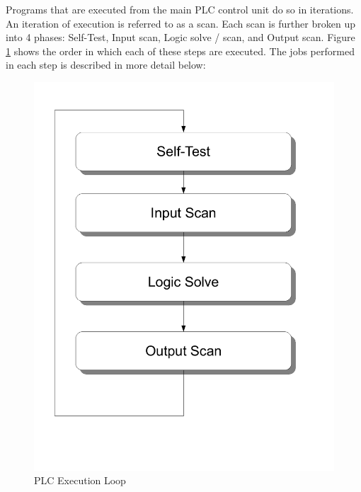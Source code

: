 \pagebreak
Programs that are executed from the main PLC control unit do so in iterations. An iteration of execution is referred to as a scan. Each scan is further broken up into 4 phases: Self-Test, Input scan, Logic solve / scan, and Output scan. Figure \ref{fig:plcexecution} shows the order in which each of these steps are executed. The jobs performed in each step is described in more detail below:
\begin{figure}[htb]
    \centering
    \includegraphics[width=\imgmedphoto]{./images/plcexecution.pdf}
    \caption{PLC Execution Loop}
    \label{fig:plcexecution}
\end{figure}

